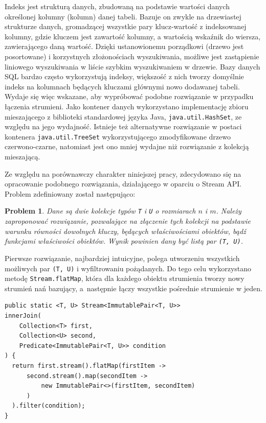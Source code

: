 \documentclass[12pt,twoside,openright]{extarticle}
\newtheorem{theorem}{Problem}
\begin{document}
    Indeks jest strukturą danych, zbudowaną na podstawie wartości danych określonej kolumny (kolumn) danej tabeli. Bazuje on zwykle na drzewiastej strukturze danych, gromadzącej wszystkie pary klucz-wartość z indeksowanej kolumny, gdzie kluczem jest zawartość kolumny, a wartością wskaźnik do wiersza, zawierającego daną wartość. Dzięki ustanowionemu porządkowi (drzewo jest posortowane) i korzystnych złożonościach wyszukiwania, możliwe jest zastąpienie liniowego wyszukiwania w liście szybkim wyszukiwaniem w drzewie. Bazy danych SQL bardzo często wykorzystują indeksy, większość z nich tworzy domyślnie indeks na kolumnach będących kluczami głównymi nowo dodawanej tabeli. Wydaje się więc wskazane, aby wypróbować podobne rozwiązanie w przypadku łączenia strumieni. Jako kontener danych wykorzystano implementację zbioru mieszającego z biblioteki standardowej języka Java, \texttt{java.util.HashSet}, ze względu na jego wydajność. Istnieje też alternatywne rozwiązanie w postaci kontenera \texttt{java.util.TreeSet} wykorzystującego zmodyfikowane drzewo czerwono-czarne, natomiast jest ono mniej wydajne niż rozwiązanie z kolekcją mieszającą.

    Ze względu na porównawczy charakter niniejszej pracy, zdecydowano się na opracowanie podobnego rozwiązania, działającego w oparciu o Stream API. Problem zdefiniowany został następująco:

\begin{theorem}
    Dane są dwie kolekcje typów \texttt{T} i \texttt{U} o rozmiarach $ n $ i $ m $. Należy zaproponować rozwiązanie, pozwalające na złączenie tych kolekcji na podstawie warunku równości dowolnych kluczy, będących właściwościami obiektów, bądź funkcjami właściwości obiektów. Wynik powinien dany być listą par \texttt{(T, U)}.
\end{theorem}

    Pierwsze rozwiązanie, najbardziej intuicyjne, polega utworzeniu wszystkich możliwych par \texttt{(T, U)} i wyfiltrowaniu pożądanych. Do tego celu wykorzystano metodę \texttt{Stream.flatMap}, która dla każdego obiektu strumienia tworzy nowy strumień nań bazujący, a~następnie łączy wszystkie pośrednie strumienie w jeden.

\begin{lstlisting}[label=join1, caption=Propozycja rozwiązania nr 1]
public static <T, U> Stream<ImmutablePair<T, U>>
innerJoin(
    Collection<T> first,
    Collection<U> second,
    Predicate<ImmutablePair<T, U>> condition
) {
  return first.stream().flatMap(firstItem ->
      second.stream().map(secondItem ->
          new ImmutablePair<>(firstItem, secondItem)
      )
  ).filter(condition);
}

\end{lstlisting}
\end{document}
